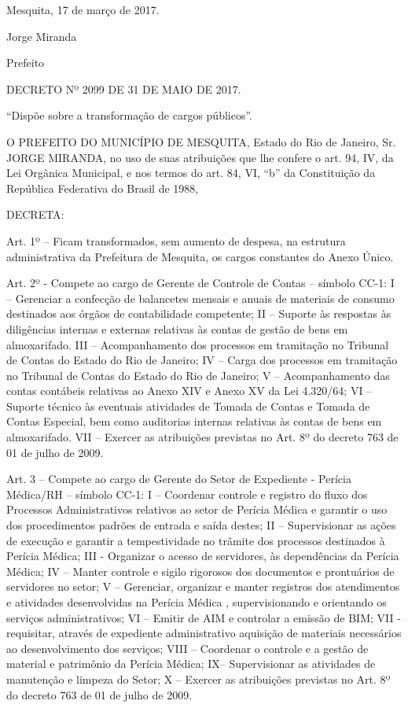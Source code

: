 \documentclass{doliberto}
\begin{document}
 

Mesquita, 17 de março de 2017.  

Jorge Miranda 

Prefeito 

DECRETO Nº 2099 DE 31 DE MAIO DE 2017. 

“Dispõe sobre a transformação de cargos públicos”. 
 
O PREFEITO DO MUNICÍPIO DE MESQUITA, Estado do Rio 
de Janeiro, Sr. JORGE MIRANDA, no uso de suas atribuições 
que lhe confere o art. 94, IV, da Lei Orgânica Municipal, e nos 
termos  do  art.  84,  VI,  “b”  da  Constituição  da  República 
Federativa do Brasil de 1988, 
 
DECRETA: 
 
Art. 1º – Ficam transformados, sem aumento de despesa, na 
estrutura  administrativa  da  Prefeitura  de  Mesquita,  os 
cargos constantes do Anexo Único. 


Art.  2º  -    Compete  ao  cargo    de    Gerente  de  Controle  de 
Contas – símbolo CC-1: 
I – Gerenciar a confecção de balancetes mensais e anuais de 
materiais  de  consumo  destinados  aos  órgãos  de 
contabilidade competente; 
II – Suporte às respostas às diligências internas e externas 
relativas às contas de gestão de bens em almoxarifado. 
III  –  Acompanhamento  dos  processos  em  tramitação  no 
Tribunal de Contas do Estado do Rio de Janeiro; 
IV  –  Carga  dos  processos  em  tramitação  no  Tribunal  de 
Contas do Estado do Rio de Janeiro; 
V  –  Acompanhamento  das  contas  contábeis  relativas  ao 
Anexo XIV e Anexo XV da Lei 4.320/64; 
VI – Suporte técnico às eventuais atividades de Tomada de 
Contas e Tomada de Contas Especial, bem como auditorias 
internas relativas às contas de bens em almoxarifado. 
VII – Exercer as atribuições previstas no Art. 8º do decreto 
763 de 01 de julho de 2009. 
 
Art. 3 – Compete ao cargo de Gerente do Setor de Expediente 
- Perícia Médica/RH – símbolo CC-1: 
I  –  Coordenar  controle  e  registro  do  fluxo  dos  Processos 
Administrativos  relativos  ao  setor  de  Perícia  Médica  e 
garantir  o  uso  dos  procedimentos  padrões  de  entrada  e 
saída destes; 
II  –  Supervisionar  as  ações  de  execução  e  garantir  a 
tempestividade  no  trâmite  dos  processos  destinados  à 
Perícia Médica; 
III  -  Organizar  o  acesso  de  servidores,  às  dependências  da 
Perícia Médica; 
IV  –  Manter  controle  e  sigilo  rigorosos  dos  documentos  e 
prontuários de servidores no setor; 
V  –  Gerenciar,  organizar  e  manter  registros  dos 
atendimentos e atividades desenvolvidas na Perícia Médica , 
supervisionando e orientando os serviços administrativos; 
VI – Emitir de AIM e controlar a emissão de BIM; 
VII  -  requisitar,  através  de  expediente  administrativo 
aquisição de materiais necessários ao desenvolvimento dos 
serviços; 
VIII  –  Coordenar  o  controle  e  a  gestão  de  material  e 
patrimônio da Perícia Médica; 
IX– Supervisionar as atividades de manutenção e limpeza do 
Setor; 
X – Exercer as atribuições previstas no Art. 8º do decreto 763 
de 01 de julho de 2009. 
 
\end{document}
